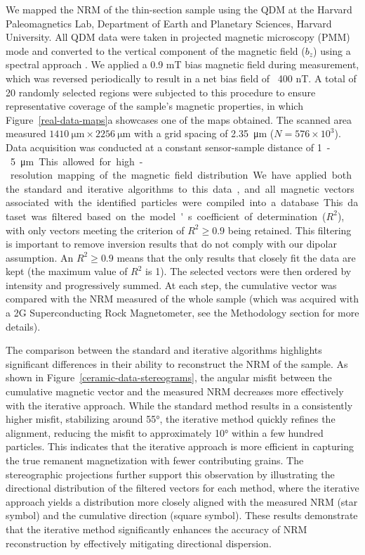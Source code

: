 We mapped the NRM of the thin-section sample using the QDM at the Harvard Paleomagnetics Lab, Department of Earth and Planetary Sciences, Harvard University. All QDM data were taken in projected magnetic microscopy (PMM) mode and converted to the vertical component of the magnetic field ($b_z$) using a spectral approach \citep{Fu2020, Glenn2017, Lima2009}. We applied a 0.9 mT bias magnetic field during measurement, which was reversed periodically to result in a net bias field of ~400 nT. A total of 20 randomly selected regions were subjected to this procedure to ensure representative coverage of the sample's magnetic properties, in which Figure~\ref{real-data-maps}a showcases one of the maps obtained. The scanned area measured $\qty{1410}{\um} \times \qty{2256}{\um}$ with a grid spacing of \qty{2.35}{\um} ($N = 576 \times 10^{3}$). Data acquisition was conducted at a constant sensor-sample distance of \qty{1} - \qty{5}{\um}. This allowed for high-resolution mapping of the magnetic field distribution.

We have applied both the standard and iterative algorithms to this data, and all magnetic vectors associated with the identified particles were compiled into a database. This dataset was filtered based on the model's coefficient of determination ($R^2$), with only vectors meeting the criterion of $R^2 \geq 0.9$ being retained. This filtering is important to remove inversion results that do not comply with our dipolar assumption. An $R^2 \geq 0.9$ means that the only results that closely fit the data are kept (the maximum value of $R^2$ is 1).  The selected vectors were then ordered by intensity and progressively summed. At each step, the cumulative vector was compared with the NRM measured of the whole sample (which was acquired with a 2G Superconducting Rock Magnetometer, see the Methodology section for more details).

The comparison between the standard and iterative algorithms highlights significant differences in their ability to reconstruct the NRM of the sample. As shown in Figure~\ref{ceramic-data-stereograms}, the angular misfit between the cumulative magnetic vector and the measured NRM decreases more effectively with the iterative approach. While the standard method results in a consistently higher misfit, stabilizing around \ang{55}, the iterative method quickly refines the alignment, reducing the misfit to approximately \ang{10} within a few hundred particles. This indicates that the iterative approach is more efficient in capturing the true remanent magnetization with fewer contributing grains. The stereographic projections further support this observation by illustrating the directional distribution of the filtered vectors for each method, where the iterative approach yields a distribution more closely aligned with the measured NRM (star symbol) and the cumulative direction (square symbol). These results demonstrate that the iterative method significantly enhances the accuracy of NRM reconstruction by effectively mitigating directional dispersion.

